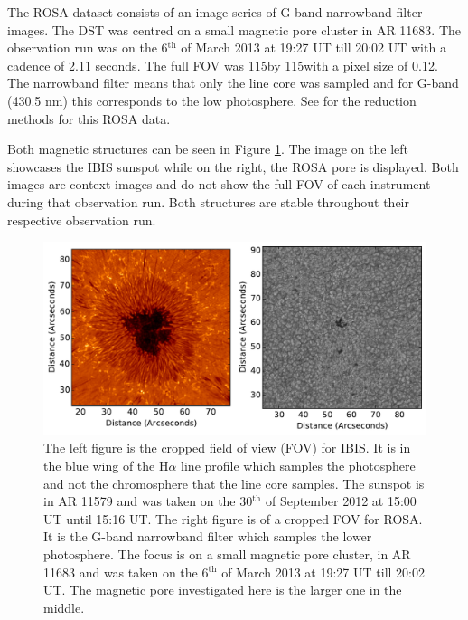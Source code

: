     The ROSA dataset consists of an image series of G-band narrowband filter images.
    The DST was centred on a small magnetic pore cluster in AR 11683.
    The observation run was on the 6$^{\mathrm{th}}$ of March 2013 at 19:27 UT till 20:02 UT with a cadence of 2.11 seconds.
    The full FOV was 115\arcsecs by 115\arcsecs with a pixel size of 0.12\arcsecs.
    The narrowband filter means that only the line core was sampled and for G-band (430.5 nm) this corresponds to the low photosphere.
    See \cite{0004-637X-806-1-132} for the reduction methods for this ROSA data.
    
    Both magnetic structures can be seen in Figure \ref{fig:data_overview}.
    The image on the left showcases the  IBIS sunspot while on the right, the ROSA pore is displayed.
    Both images are context images and do not show the full FOV of each instrument during that observation run.
    Both structures are stable throughout their respective observation run.

    \begin{figure}
        \centering
        \includegraphics[width=\textwidth]{overview.pdf}
        \caption{
                The left figure is the cropped field of view (FOV) for IBIS.
                It is in the blue wing of the H$\alpha$ line profile which samples the photosphere and not the chromosphere that the line core samples.
                The sunspot is in AR 11579 and was taken on the 30$^{\mathrm{th}}$ of September 2012 at 15:00 UT until 15:16 UT.
                The right figure is of a cropped FOV for ROSA.
                It is the G-band narrowband filter which samples the lower photosphere.
                The focus is on a small magnetic pore cluster, in AR 11683 and was taken on the 6$^{\mathrm{th}}$ of March 2013 at 19:27 UT till 20:02 UT.
                The magnetic pore investigated here is the larger one in the middle.
                }
        \label{fig:data_overview}
    \end{figure}
        
